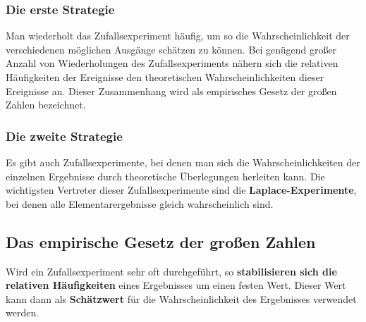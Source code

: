\documentclass[
  ngerman,
]{book}
\begin{document}
\hypertarget{die-erste-strategie}{%
\subsubsection*{Die erste Strategie}\label{die-erste-strategie}}

Man wiederholt das Zufallsexperiment häufig, um so die Wahrscheinlichkeit der verschiedenen möglichen Ausgänge schätzen zu können. Bei genügend großer Anzahl von Wiederholungen des Zufallsexperiments nähern sich die relativen Häufigkeiten der Ereignisse den theoretischen Wahrscheinlichkeiten dieser Ereignisse an. Dieser Zusammenhang wird als empirisches Gesetz der großen Zahlen bezeichnet.

\hypertarget{die-zweite-strategie}{%
\subsubsection*{Die zweite Strategie}\label{die-zweite-strategie}}

Es gibt auch Zufallsexperimente, bei denen man sich die Wahrscheinlichkeiten der einzelnen Ergebnisse durch theoretische Überlegungen herleiten kann. Die wichtigsten Vertreter dieser Zufallsexperimente sind die \textbf{Laplace-Experimente}, bei denen alle Elementarergebnisse gleich wahrscheinlich sind.

\hypertarget{section-72}{%
\subsubsection*{}\label{section-72}}

\hypertarget{section-73}{%
\subsubsection*{}\label{section-73}}

\hypertarget{das-empirische-gesetz-der-grouxdfen-zahlen}{%
\subsection*{Das empirische Gesetz der großen Zahlen}\label{das-empirische-gesetz-der-grouxdfen-zahlen}}

Wird ein Zufallsexperiment sehr oft durchgeführt, so \textbf{stabilisieren sich die relativen Häufigkeiten} eines Ergebnisses um einen festen Wert. Dieser Wert kann dann als \textbf{Schätzwert} für die Wahrscheinlichkeit des Ergebnisses verwendet werden.
\end{document}
